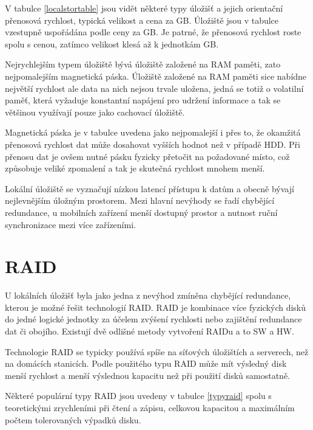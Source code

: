 \documentclass[czech,DP]{thesiskiv}
\begin{document}
V tabulce \ref{localstortable} jsou vidět některé typy úložišť a jejich orientační přenosová rychlost, typická velikost a cena za GB. Úložiště jsou v tabulce vzestupně uspořádána podle ceny za GB. Je patrné, že přenosová rychlost roste spolu s cenou, zatímco velikost klesá až k jednotkám GB. 

Nejrychlejším typem úložiště bývá úložiště založené na RAM paměti, zato nejpomalejším magnetická páska. Úložiště založené na RAM paměti sice nabídne největší rychlost ale data na nich nejsou trvale uložena, jedná se totiž o volatilní paměť, která vyžaduje konstantní napájení pro udržení informace a tak se většinou využívají pouze jako cachovací úložiště.

Magnetická páska je v tabulce uvedena jako nejpomalejší i přes to, že okamžitá přenosová rychlost dat může dosahovat vyšších hodnot než v případě HDD. Při přenosu dat je ovšem nutné pásku fyzicky přetočit na požadované místo, což způsobuje veliké zpomalení a tak je skutečná rychlost mnohem menší.
 
Lokální úložiště se vyznačují nízkou latencí přístupu k datům a obecně bývají nejlevnějším úložným prostorem. Mezi hlavní nevýhody se řadí chybějící redundance, u mobilních zařízení menší dostupný prostor a nutnost ruční synchronizace mezi více zařízeními.

\section{RAID}

U lokálních úložišť byla jako jedna z nevýhod zmíněna chybějící redundance, kterou je možné řešit technologií RAID. RAID je kombinace více fyzických disků do jedné logické jednotky za účelem zvýšení rychlosti nebo zajištění redundance dat či obojího. Existují dvě odlišné metody vytvoření RAIDu a to SW a HW.

Technologie RAID se typicky používá spíše na síťových úložištích a serverech, než na domácích stanicích. Podle použitého typu RAID může mít výsledný disk menší rychlost a menší výslednou kapacitu než při použití disků samostatně.

Některé populární typy RAID jsou uvedeny v tabulce \ref{typyraid} spolu s teoretickými zrychleními při čtení a zápisu, celkovou kapacitou a maximálním počtem tolerovaných výpadků disku.
\end{document}

